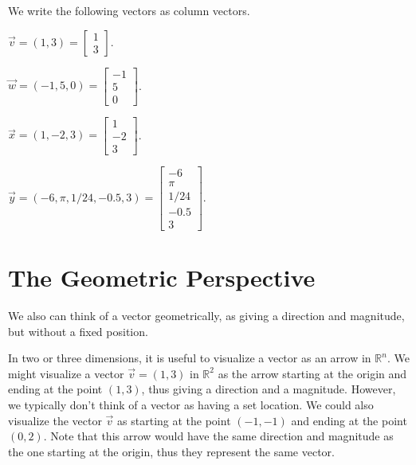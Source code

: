 \documentclass{ximera}
\begin{document}
\begin{example}
We write the following vectors as column vectors.

$\vec{v} = (1,3)=\left[\begin{array}{c}1\\3\end{array}\right]$.

$\vec{w} = (-1,5,0)=\left[\begin{array}{c}-1\\5\\0\end{array}\right]$.

$\vec{x} = (1,-2,3)=\left[\begin{array}{c}1\\-2\\3\end{array}\right]$.

$\vec{y} = (-6,\pi, 1/24, -0.5, 3)=\left[\begin{array}{c}-6\\\pi\\1/24\\-0.5\\3\end{array}\right]$.
\end{example}

\section{The Geometric Perspective}

We also can think of a vector geometrically, as giving a direction and magnitude, but without a fixed position.

In two or three dimensions, it is useful to visualize a vector as an arrow in $\mathbb{R}^n$. We might visualize a vector $\vec{v}=(1,3)$ in $\mathbb{R}^2$ as the arrow starting at the origin and ending at the point $(1,3)$, thus giving a direction and a magnitude. However, we typically don't think of a vector as having a set location. We could also visualize the vector $\vec{v}$ as starting at the point $(-1,-1)$ and ending at the point $(0,2)$. Note that this arrow would have the same direction and magnitude as the one starting at the origin, thus they represent the same vector.
\end{document}
